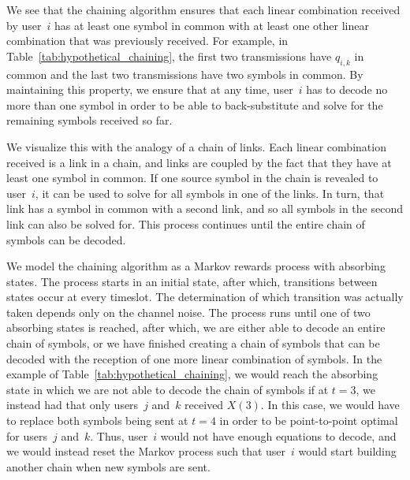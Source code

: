 
We see that the chaining algorithm ensures that each linear combination received by user~$i$ has at least one symbol in common with at least one other linear combination that was previously received.  For example, in Table~\ref{tab:hypothetical_chaining}, the first two transmissions have $q_{i, k}$ in common and the last two transmissions have two symbols in common.  By maintaining this property, we ensure that at any time, user~$i$ has to decode no more than one symbol in order to be able to back-substitute and solve for the remaining symbols received so far.  

We visualize this with the analogy of a chain of links.  Each linear combination received is a link in a chain, and links are coupled by the fact that they have at least one symbol in common.  If one source symbol in the chain is revealed to user~$i$, it can be used to solve for all symbols in one of the links.  In turn, that link has a symbol in common with a second link, and so all symbols in the second link can also be solved for.  This process continues until the entire chain of symbols can be decoded.  




We model the chaining algorithm as a Markov rewards process with absorbing states.  The process starts in an initial state, after which, transitions between states occur at every timeslot.  The determination of which transition was actually taken depends only on the channel noise.  The process runs until one of two absorbing states is reached, after which, we are either able to decode an entire chain of symbols, or we have finished creating a chain of symbols that can be decoded with the reception of one more linear combination of symbols.  In the example of Table~\ref{tab:hypothetical_chaining}, we would reach the absorbing state in which we are not able to decode the chain of symbols if at $t = 3$, we instead had that only users~$j$ and~$k$ received $X(3)$.  In this case, we would have to replace both symbols being sent at $t = 4$ in order to be point-to-point optimal for users~$j$ and~$k$.  Thus, user~$i$ would not have enough equations to decode, and we would instead reset the Markov process such that user~$i$ would start building another chain when new symbols are sent.

